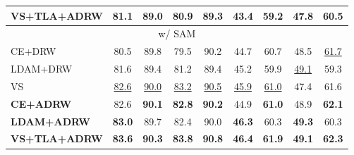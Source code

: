\begin{table}[!t]
{\begin{tabular}{l|cccc|cccc}
            {\textbf{VS+TLA+ADRW}} & \textcolor[rgb]{ .957,  .533,  .439}{\textbf{81.1}} & \textcolor[rgb]{ .957,  .533,  .439}{\textbf{89.0}} & \textcolor[rgb]{ .957,  .533,  .439}{\textbf{80.9}} & \textcolor[rgb]{ .957,  .533,  .439}{\textbf{89.3}} & \textcolor[rgb]{ .957,  .533,  .439}{\textbf{43.4}} & \textcolor[rgb]{ .957,  .533,  .439}{\textbf{59.2}} & \textcolor[rgb]{ .957,  .533,  .439}{\textbf{47.8}} & \textcolor[rgb]{ .957,  .533,  .439}{\textbf{60.5}} \\
            \midrule
            \multicolumn{9}{c}{w/ SAM} \\
            \midrule
            CE+DRW & 80.5 & 89.8 & 79.5 & 90.2 & 44.7 & 60.7 & 48.5 & \underline{61.7} \\
            LDAM+DRW & 81.6 & 89.4 & 81.2 & 89.4 & 45.2 & 59.9 & \underline{49.1} & 59.3 \\
            VS    & \underline{82.6} & \underline{90.0} & \underline{83.2} & \underline{90.5} & \underline{45.9} & \underline{61.0} & 47.4 & 61.6 \\
            \midrule
            {\textbf{CE+ADRW}} & 82.6 & \textcolor[rgb]{ .4,  .671,  .867}{\textbf{90.1}} & \textcolor[rgb]{ .4,  .671,  .867}{\textbf{82.8}} & \textcolor[rgb]{ .4,  .671,  .867}{\textbf{90.2}} & 44.9 & \textcolor[rgb]{ .4,  .671,  .867}{\textbf{61.0}} & 48.9 & \textcolor[rgb]{ .4,  .671,  .867}{\textbf{62.1}} \\
            {\textbf{LDAM+ADRW}} & \textcolor[rgb]{ .4,  .671,  .867}{\textbf{83.0}} & 89.7 & 82.4 & 90.0 & \textcolor[rgb]{ .4,  .671,  .867}{\textbf{46.3}} & 60.3 & \textcolor[rgb]{ .957,  .533,  .439}{\textbf{49.3}} & 60.3 \\
            {\textbf{VS+TLA+ADRW}} & \textcolor[rgb]{ .957,  .533,  .439}{\textbf{83.6}} & \textcolor[rgb]{ .957,  .533,  .439}{\textbf{90.3}} & \textcolor[rgb]{ .957,  .533,  .439}{\textbf{83.8}} & \textcolor[rgb]{ .957,  .533,  .439}{\textbf{90.8}} & \textcolor[rgb]{ .957,  .533,  .439}{\textbf{46.4}} & \textcolor[rgb]{ .957,  .533,  .439}{\textbf{61.9}} & \textcolor[rgb]{ .4,  .671,  .867}{\textbf{49.1}} & \textcolor[rgb]{ .957,  .533,  .439}{\textbf{62.3}} \\
            \bottomrule
        \end{tabular}}
    \label{tab:caifar}\end{table}

